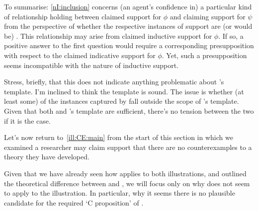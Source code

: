 \begin{note}
  To summarise:
  \ref{nI:inclusion} concerns (an agent's confidence in) a particular kind of relationship holding between claimed support for \(\phi\) and claiming support for \(\psi\) from the perspective of whether the respective instances of support are (or would be) \mom{}.
  This relationship may arise from claimed inductive support for \(\phi\).
  If so, a positive answer to the first question would require a corresponding presupposition with respect to the claimed indicative support for \(\phi\).
  Yet, such a presupposition seems incompatible with the nature of inductive support.
\end{note}

\begin{note}
  Stress, briefly, that this does not indicate anything problematic about \citeauthor{Wright:2011wn}'s template.
  I'm inclined to think the template is sound.
  The issue is whether (at least some) of the instances captured by \nI{} fall outside the scope of \citeauthor{Wright:2011wn}'s template.
  Given that both \nI{} and \citeauthor{Wright:2011wn}'s template are sufficient, there's no tension between the two if it is the case.
\end{note}

\begin{note}
  Let's now return to~\autoref{ill:CE:main} from the start of this section in which we examined a researcher may claim support that there are no counterexamples to a theory they have developed.

  Given that we have already seen how \nI{} applies to both illustrations, and outlined the theoretical difference between \nI{} and \wrt{}, we will focus only on why \wrt{} does not seem to apply to the illustration.
  In particular, why it seems there is no plausible candidate for the required `C proposition' of \wrt{}.
\end{note}

